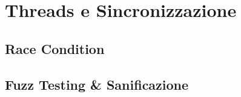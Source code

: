 \chapter{Threads e Sincronizzazione}

\section{Race Condition}

\section{Fuzz Testing \& Sanificazione}